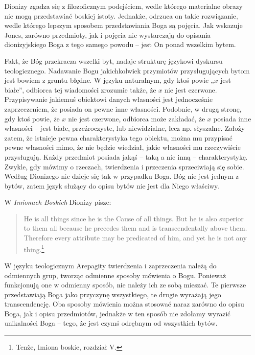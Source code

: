 Dionizy zgadza się z filozoficznym podejściem, wedle którego materialne
obrazy nie mogą przedstawiać boskiej istoty. Jednakże, odrzuca on takie
rozwiązanie, wedle którego lepszym sposobem przedstawiania Boga są
pojęcia. Jak wskazuje Jones, zarówno przedmioty, jak i pojęcia nie
wystarczają do opisania dionizyjskiego Boga z tego samego powodu -- jest
On ponad wszelkim bytem.

Fakt, że Bóg przekracza wszelki byt, nadaje strukturę językowi dyskursu
teologicznego. Nadawanie Bogu jakichkolwiek przymiotów przysługujących
bytom jest bowiem z gruntu błędne. W języku naturalnym, gdy ktoś powie
„$x$ jest białe”, odbiorca tej wiadomości zrozumie także, że $x$ nie jest
czerwone. Przypisywanie jakiemuś obiektowi danych własności jest
jednocześnie zaprzeczeniem, że posiada on pewne inne własności.
Podobnie, w drugą stronę, gdy ktoś powie, że $x$ nie jest czerwone,
odbiorca może zakładać, że $x$ posiada inne własności -- jest białe,
przeźroczyste, lub niewidzialne, lecz np. słyszalne. Założy zatem, że
istnieje pewna charakterystyka tego obiektu, można mu przypisać pewne
własności mimo, że nie będzie wiedział, jakie własności mu rzeczywiście
przysługują. Każdy przedmiot posiada jakąś -- taką a nie inną –
charakterystykę. Zwykle, gdy mówimy o rzeczach, twierdzenia i
przeczenia sprzeciwiają się sobie. Według Dionizego nie dzieje się tak
w przypadku Boga. Bóg nie jest jednym z bytów, zatem język służący do
opisu bytów nie jest dla Niego właściwy.

W \textit{Imionach Boskich} Dionizy pisze:


\begin{quote}
    He is all things since he is the Cause of all things. But he is also
superior to them all because he precedes them and is transcendentally
above them. Therefore every attribute may be predicated of him, and yet
he is not any thing.\footnote{Tenże, Imiona boskie, rozdział V.}
\end{quote}



W języku teologicznym Arepagity twierdzenia i zaprzeczenia należą do
odmiennych grup, tworząc odmienne sposoby mówienia o Bogu. Ponieważ
funkcjonują one w odmienny sposób, nie należy ich ze sobą mieszać. Te
pierwsze przedstawiają Boga jako przyczynę wszystkiego, te drugie
wyrażają jego transcendencję. Oba sposoby mówienia można stosować naraz
zarówno do opisu Boga, jak i opisu przedmiotów, jednakże w ten sposób
nie zdołamy wyrazić unikalności Boga -- tego, że jest czymś odrębnym od
wszystkich bytów.


